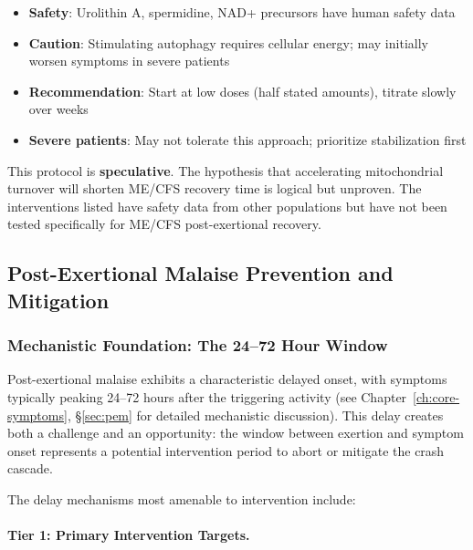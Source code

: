 \begin{itemize}
    \item \textbf{Safety}: Urolithin A, spermidine, NAD+ precursors have human safety data
    \item \textbf{Caution}: Stimulating autophagy requires cellular energy; may initially worsen symptoms in severe patients
    \item \textbf{Recommendation}: Start at low doses (half stated amounts), titrate slowly over weeks
    \item \textbf{Severe patients}: May not tolerate this approach; prioritize stabilization first
\end{itemize}

\begin{warning}
This protocol is \textbf{speculative}. The hypothesis that accelerating mitochondrial turnover will shorten ME/CFS recovery time is logical but unproven. The interventions listed have safety data from other populations but have not been tested specifically for ME/CFS post-exertional recovery.
\end{warning}

\subsection{Post-Exertional Malaise Prevention and Mitigation}
\label{subsec:pem-prevention}

\subsubsection{Mechanistic Foundation: The 24--72 Hour Window}

Post-exertional malaise exhibits a characteristic delayed onset, with symptoms typically peaking 24--72 hours after the triggering activity (see Chapter~\ref{ch:core-symptoms}, \S\ref{sec:pem} for detailed mechanistic discussion). This delay creates both a challenge and an opportunity: the window between exertion and symptom onset represents a potential intervention period to abort or mitigate the crash cascade.

The delay mechanisms most amenable to intervention include:

\paragraph{Tier 1: Primary Intervention Targets.}

